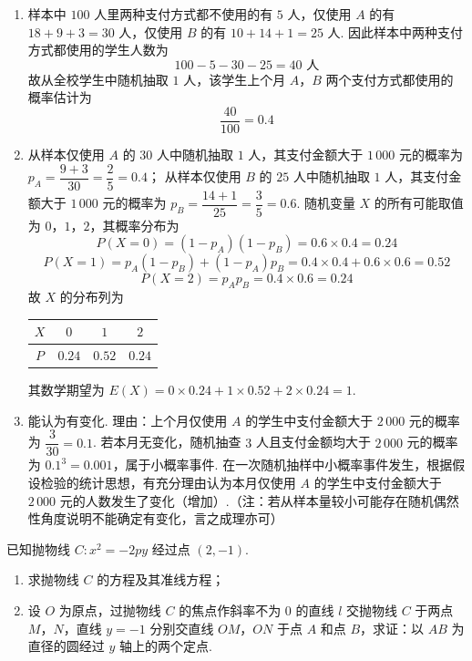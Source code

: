 \begin{solution}
\begin{enumerate}
\item 样本中 \(100\) 人里两种支付方式都不使用的有 \(5\) 人，仅使用 \(A\) 的有 \(18+9+3=30\) 人，仅使用 \(B\) 的有 \(10+14+1=25\) 人. 因此样本中两种支付方式都使用的学生人数为
\[
100-5-30-25=40\text{ 人}
\]
故从全校学生中随机抽取 \(1\) 人，该学生上个月 \(A\)，\(B\) 两个支付方式都使用的概率估计为
\[
\frac{40}{100}=0.4
\]

\item 从样本仅使用 \(A\) 的 \(30\) 人中随机抽取 \(1\) 人，其支付金额大于 \(1\,000\) 元的概率为 \(p_A=\dfrac{9+3}{30}=\dfrac25=0.4\)；
从样本仅使用 \(B\) 的 \(25\) 人中随机抽取 \(1\) 人，其支付金额大于 \(1\,000\) 元的概率为 \(p_B=\dfrac{14+1}{25}=\dfrac35=0.6\).
随机变量 \(X\) 的所有可能取值为 \(0\)，\(1\)，\(2\)，其概率分布为
\[
P(X=0)=(1-p_A)(1-p_B)=0.6\times0.4=0.24
\]
\[
P(X=1)=p_A(1-p_B)+(1-p_A)p_B=0.4\times0.4+0.6\times0.6=0.52
\]
\[
P(X=2)=p_A p_B=0.4\times0.6=0.24
\]
故 \(X\) 的分布列为
\begin{center}
\begin{tabular}{c|ccc}
\(X\) & \(0\) & \(1\) & \(2\) \\ \hline
\(P\) & \(0.24\) & \(0.52\) & \(0.24\)
\end{tabular}
\end{center}
其数学期望为 \(E(X)=0\times0.24+1\times0.52+2\times0.24=1\).

\item 能认为有变化. 理由：上个月仅使用 \(A\) 的学生中支付金额大于 \(2\,000\) 元的概率为 \(\dfrac{3}{30}=0.1\). 若本月无变化，随机抽查 \(3\) 人且支付金额均大于 \(2\,000\) 元的概率为 \(0.1^3=0.001\)，属于小概率事件. 在一次随机抽样中小概率事件发生，根据假设检验的统计思想，有充分理由认为本月仅使用 \(A\) 的学生中支付金额大于 \(2\,000\) 元的人数发生了变化（增加）.（注：若从样本量较小可能存在随机偶然性角度说明不能确定有变化，言之成理亦可）
\end{enumerate}
\end{solution}

\begin{problem}
已知抛物线 \(C:x^2=-2py\) 经过点 \((2,-1)\).

\begin{enumerate}
\item 求抛物线 \(C\) 的方程及其准线方程；

\item 设 \(O\) 为原点，过抛物线 \(C\) 的焦点作斜率不为 \(0\) 的直线 \(l\) 交抛物线 \(C\) 于两点 \(M\)，\(N\)，直线 \(y=-1\) 分别交直线 \(OM\)，\(ON\) 于点 \(A\) 和点 \(B\)，求证：以 \(AB\) 为直径的圆经过 \(y\) 轴上的两个定点.
\end{enumerate}
\end{problem}


